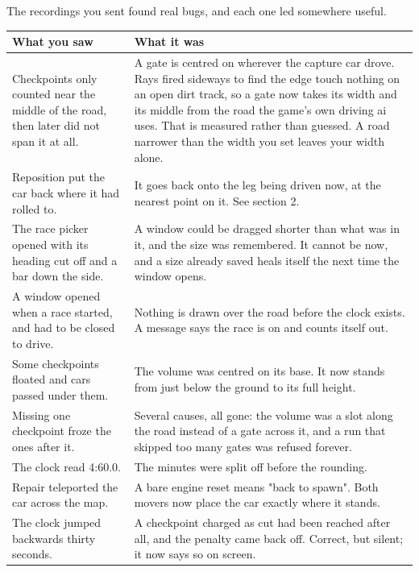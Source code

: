 \documentclass[11pt,a4paper]{article}
\begin{document}
The recordings you sent found real bugs, and each one led somewhere useful.

\begin{longtable}{@{}>{\raggedright\arraybackslash}p{78mm}>{\raggedright\arraybackslash}p{80mm}@{}}
\toprule
\textbf{What you saw} & \textbf{What it was} \\
\midrule
\endhead
Checkpoints only counted near the middle of the road, then later did not span
it at all.
& A gate is centred on wherever the capture car drove. Rays fired sideways to
  find the edge touch nothing on an open dirt track, so a gate now takes its
  width and its middle from the road the game's own driving ai uses. That is
  measured rather than guessed. A road narrower than the width you set leaves
  your width alone. \\
\addlinespace
Reposition put the car back where it had rolled to.
& It goes back onto the leg being driven now, at the nearest point on it. See
  section 2. \\
\addlinespace
The race picker opened with its heading cut off and a bar down the side.
& A window could be dragged shorter than what was in it, and the size was
  remembered. It cannot be now, and a size already saved heals itself the next
  time the window opens. \\
\addlinespace
A window opened when a race started, and had to be closed to drive.
& Nothing is drawn over the road before the clock exists. A message says the
  race is on and counts itself out. \\
\addlinespace
Some checkpoints floated and cars passed under them.
& The volume was centred on its base. It now stands from just below the
  ground to its full height. \\
\addlinespace
Missing one checkpoint froze the ones after it.
& Several causes, all gone: the volume was a slot along the road instead of a
  gate across it, and a run that skipped too many gates was refused forever. \\
\addlinespace
The clock read 4:60.0.
& The minutes were split off before the rounding. \\
\addlinespace
Repair teleported the car across the map.
& A bare engine reset means "back to spawn". Both movers now place the car
  exactly where it stands. \\
\addlinespace
The clock jumped backwards thirty seconds.
& A checkpoint charged as cut had been reached after all, and the penalty
  came back off. Correct, but silent; it now says so on screen. \\

\end{longtable}
\end{document}
